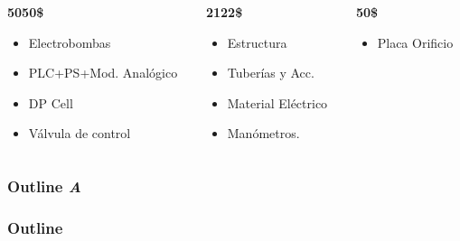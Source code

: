 {\begin{columns}[T]
	 \begin{column}{0.3\textwidth}
	    \begin{techintblock}
		\centering
		\textbf{5050\$}
	    \end{techintblock}
	    \footnotesize
	    \begin{itemize}
	     \item Electrobombas
	     \item PLC+PS+Mod. Analógico
	     \item DP Cell
	     \item Válvula de control
	    \end{itemize}
	 \end{column}
	 
	 \begin{column}{0.3\textwidth}
	    \begin{fingblock}
		\centering
		\textbf{2122\$}
	    \end{fingblock}
	    \footnotesize
	     \begin{itemize}
	      \item Estructura
	      \item Tuberías y Acc.
	      \item Material Eléctrico
	      \item Manómetros.
	     \end{itemize}
	 \end{column}

	 \begin{column}{0.3\textwidth}
	    \begin{puglesiblock}
		\centering
		\textbf{50\$}
	    \end{puglesiblock}
	    \footnotesize
	    \begin{itemize}
	     \item Placa Orificio
	    \end{itemize}

	 \end{column}

	\end{columns}
	
}

\begin{frame}
	\ifdebug
	\frametitle{Outline\hfill{\color{red} \emph{A}}}
	\else
	\frametitle{Outline}
	\fi

    \tableofcontents
\end{frame}

